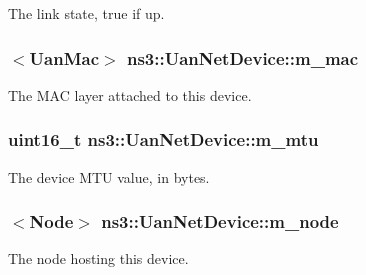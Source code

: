 The link state, true if up. 

\subsubsection[{\texorpdfstring{m\+\_\+mac}{m_mac}}]{$<${\bf Uan\+Mac}$>$ ns3\+::\+Uan\+Net\+Device\+::m\+\_\+mac\hspace{0.3cm}{\ttfamily [private]}}\hypertarget{classns3_1_1UanNetDevice_af07aff40dbb010fd62ad0fdcbf394995}{}\label{classns3_1_1UanNetDevice_af07aff40dbb010fd62ad0fdcbf394995}


The M\+AC layer attached to this device. 

\subsubsection[{\texorpdfstring{m\+\_\+mtu}{m_mtu}}]{\setlength{\rightskip}{0pt plus 5cm}uint16\+\_\+t ns3\+::\+Uan\+Net\+Device\+::m\+\_\+mtu\hspace{0.3cm}{\ttfamily [private]}}\hypertarget{classns3_1_1UanNetDevice_ae7c34c0bb24052fba7fbdcfb50f94214}{}\label{classns3_1_1UanNetDevice_ae7c34c0bb24052fba7fbdcfb50f94214}


The device M\+TU value, in bytes. 

\subsubsection[{\texorpdfstring{m\+\_\+node}{m_node}}]{$<${\bf Node}$>$ ns3\+::\+Uan\+Net\+Device\+::m\+\_\+node\hspace{0.3cm}{\ttfamily [private]}}\hypertarget{classns3_1_1UanNetDevice_a762b0c54b288f7df70ecc7a701d6a720}{}\label{classns3_1_1UanNetDevice_a762b0c54b288f7df70ecc7a701d6a720}


The node hosting this device. 

